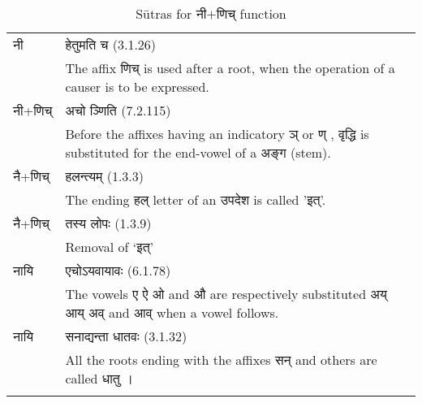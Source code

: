 		\begin{longtable}{ |p{1.6cm}|p{14.4cm}| } 
			\hline
			\rowcolor{red!10}
			\texthindi{नी}
			&\texthindi{हेतुमति च} (3.1.26) \\
			\rowcolor{red!10}
			&The affix \texthindi{णिच्} is used after a root, when the operation of a causer is to be expressed.
			\\\hline
			\rowcolor{green!10}
			\texthindi{नी}+\texthindi{णिच्}
			&\texthindi{अचो ञ्णिति} (7.2.115)\\
			\rowcolor{green!10}
			&Before the affixes having an indicatory \texthindi{ञ्} or \texthindi{ण् , वृद्धि} is substituted for the end-vowel of a \texthindi{अङ्ग} (stem).
			\\\hline
			\rowcolor{blue!10}
			\texthindi{नै}+\texthindi{णिच्}
			&\texthindi{हलन्त्यम्} (1.3.3)\\
			\rowcolor{blue!10}
			&The ending \texthindi{हल्} letter of an \texthindi{उपदेश} is called '\texthindi{इत्}'.
			\\\hline
			\rowcolor{blue!10}
			\texthindi{नै}+\texthindi{णिच्}
			&\texthindi{तस्य लोपः} (1.3.9)\\
			\rowcolor{blue!10}
			&Removal of ‘\texthindi{इत्}’
			\\\hline
			\rowcolor{green!10}
			\texthindi{नायि}
			&\texthindi{एचोऽयवायावः} (6.1.78)\\
			\rowcolor{green!10}
			&The vowels \texthindi{ए ऐ ओ} and \texthindi{औ} are respectively substituted \texthindi{अय् आय् अव्} and \texthindi{आव्} when a vowel follows.
			\\\hline
			\rowcolor{yellow!10}
			
			\texthindi{नायि}
			&\texthindi{सनाद्यन्ता धातवः} (3.1.32) \\
			\rowcolor{yellow!10}
			&All the roots ending with the affixes \texthindi{सन्} and others are called \texthindi{धातु} । 
			\\
		\hline
		\caption{Sūtras for \texthindi{नी$+$णिच्} function}
		\label{table:a5}
		\end{longtable}


